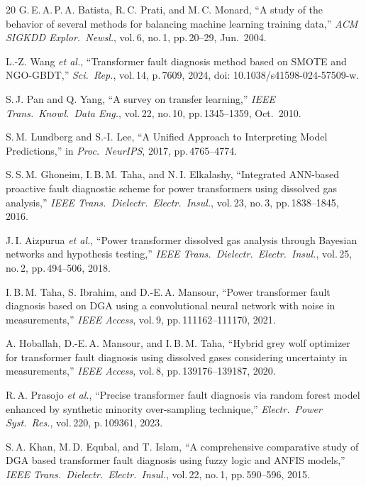 \documentclass[conference]{IEEEtran}
\begin{document}
\begin{thebibliography}{20}
G.\,E.\,A.\,P.\,A. Batista, R.\,C. Prati, and M.\,C. Monard,
``A study of the behavior of several methods for balancing machine
learning training data,''
\textit{ACM SIGKDD Explor.\ Newsl.}, vol.\,6, no.\,1, pp.\,20--29,
Jun.\ 2004.

L.-Z. Wang \textit{et al.},
``Transformer fault diagnosis method based on SMOTE and NGO-GBDT,''
\textit{Sci.\ Rep.}, vol.\,14, p.\,7609, 2024,
doi: 10.1038/s41598-024-57509-w.

S.\,J. Pan and Q. Yang,
``A survey on transfer learning,''
\textit{IEEE Trans.\ Knowl.\ Data Eng.}, vol.\,22, no.\,10,
pp.\,1345--1359, Oct.\ 2010.

S.\,M. Lundberg and S.-I. Lee,
``A Unified Approach to Interpreting Model Predictions,''
in \textit{Proc.\ NeurIPS}, 2017, pp.\,4765--4774.

S.\,S.\,M. Ghoneim, I.\,B.\,M. Taha, and N.\,I. Elkalashy,
``Integrated ANN-based proactive fault diagnostic scheme for power
transformers using dissolved gas analysis,''
\textit{IEEE Trans.\ Dielectr.\ Electr.\ Insul.}, vol.\,23, no.\,3,
pp.\,1838--1845, 2016.

J.\,I. Aizpurua \textit{et al.},
``Power transformer dissolved gas analysis through Bayesian networks
and hypothesis testing,''
\textit{IEEE Trans.\ Dielectr.\ Electr.\ Insul.}, vol.\,25, no.\,2,
pp.\,494--506, 2018.

I.\,B.\,M. Taha, S. Ibrahim, and D.-E.\,A. Mansour,
``Power transformer fault diagnosis based on DGA using a
convolutional neural network with noise in measurements,''
\textit{IEEE Access}, vol.\,9, pp.\,111162--111170, 2021.

A. Hoballah, D.-E.\,A. Mansour, and I.\,B.\,M. Taha,
``Hybrid grey wolf optimizer for transformer fault diagnosis using
dissolved gases considering uncertainty in measurements,''
\textit{IEEE Access}, vol.\,8, pp.\,139176--139187, 2020.

R.\,A. Prasojo \textit{et al.},
``Precise transformer fault diagnosis via random forest model
enhanced by synthetic minority over-sampling technique,''
\textit{Electr.\ Power Syst.\ Res.}, vol.\,220, p.\,109361, 2023.

S.\,A. Khan, M.\,D. Equbal, and T. Islam,
``A comprehensive comparative study of DGA based transformer fault
diagnosis using fuzzy logic and ANFIS models,''
\textit{IEEE Trans.\ Dielectr.\ Electr.\ Insul.}, vol.\,22, no.\,1,
pp.\,590--596, 2015.


\end{thebibliography}
\end{document}

